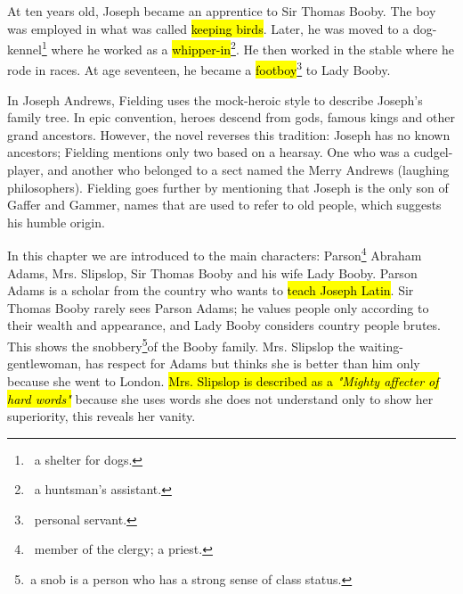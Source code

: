 \documentclass[12pt, a4paper]{article}
\begin{document}

\ind At ten years old, Joseph became an apprentice to Sir Thomas Booby. The boy was employed in what 
was called \hl{keeping birds}. Later, he was moved to a dog-kennel\footnote{\, a shelter for dogs.
} where he worked as a \hl{whipper-in}\footnote{
\, a huntsman's assistant.}. He then worked in the stable where he rode in races. At age seventeen,
he became a \hl{footboy}\footnote{\, personal servant.} to Lady Booby.






\ind In Joseph Andrews, Fielding uses the mock-heroic style to describe Joseph's
family tree. In epic convention, heroes descend from gods, famous 
kings and other grand ancestors. However, the novel reverses this tradition: 
Joseph has no known ancestors; Fielding mentions only two based on a hearsay.
One who was a cudgel-player, and another who belonged to a sect named the Merry Andrews 
(laughing philosophers). Fielding goes further 
by mentioning that Joseph is the only son of Gaffer and Gammer, names that are 
used to refer to old people, which suggests his humble origin.




\ind In this chapter we are introduced to the main characters: Parson\footnote{\, 
member of the clergy; a priest.}  Abraham Adams,
Mrs. Slipslop, Sir Thomas Booby and his wife Lady Booby. Parson Adams is a scholar from 
the country who wants to \hl{teach Joseph Latin}.
Sir Thomas Booby rarely sees Parson Adams; he values people only according to their
wealth and appearance, and Lady Booby considers country people brutes. This shows the snobbery\footnote{
\,a snob is a person who has a strong sense of class status.}of
the Booby family. Mrs. Slipslop the waiting-gentlewoman, has respect for Adams  but thinks she
is better than him only because she went to London. \hl{Mrs. Slipslop is described as a
\textit{"Mighty affecter of hard words"}}
because she uses words she does not understand only to show her superiority,
this reveals her vanity.
\end{document}
